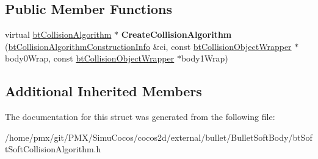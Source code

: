 \subsection*{Public Member Functions}
\begin{DoxyCompactItemize}
\item 
\mbox{\label{structbtSoftSoftCollisionAlgorithm_1_1CreateFunc_a7f38bc4f48585c2f227f28e1af2702b7}} 
virtual \hyperlink{classbtCollisionAlgorithm}{bt\+Collision\+Algorithm} $\ast$ {\bfseries Create\+Collision\+Algorithm} (\hyperlink{structbtCollisionAlgorithmConstructionInfo}{bt\+Collision\+Algorithm\+Construction\+Info} \&ci, const \hyperlink{structbtCollisionObjectWrapper}{bt\+Collision\+Object\+Wrapper} $\ast$body0\+Wrap, const \hyperlink{structbtCollisionObjectWrapper}{bt\+Collision\+Object\+Wrapper} $\ast$body1\+Wrap)
\end{DoxyCompactItemize}
\subsection*{Additional Inherited Members}


The documentation for this struct was generated from the following file\+:\begin{DoxyCompactItemize}
\item 
/home/pmx/git/\+P\+M\+X/\+Simu\+Cocos/cocos2d/external/bullet/\+Bullet\+Soft\+Body/bt\+Soft\+Soft\+Collision\+Algorithm.\+h\end{DoxyCompactItemize}
